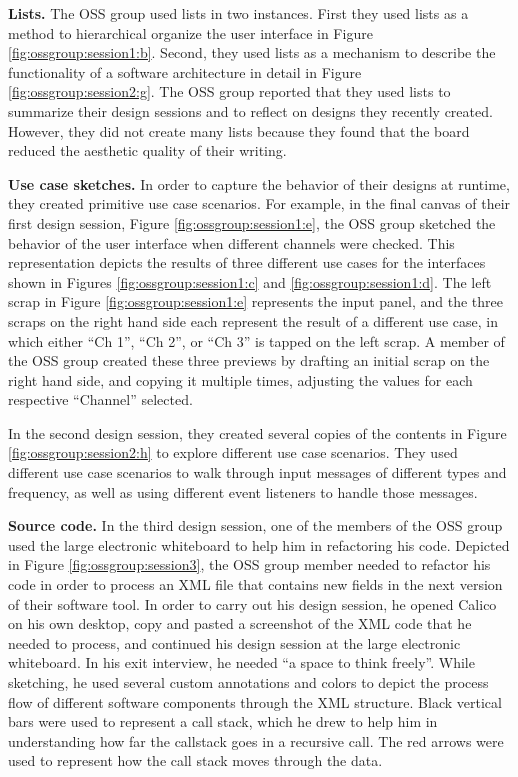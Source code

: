 \textbf{Lists. } The OSS group used lists in two instances. First they used lists as a method to hierarchical organize the user interface in Figure \ref{fig:ossgroup:session1:b}. Second, they used lists as a mechanism to describe the functionality of a software architecture in detail in Figure \ref{fig:ossgroup:session2:g}. The OSS group reported that they used lists to summarize their design sessions and to reflect on designs they recently created. However, they did not create many lists because they found that the board reduced the aesthetic quality of their writing.

\textbf{Use case sketches. } In order to capture the behavior of their designs at runtime, they created primitive use case scenarios. For example, in the final canvas of their first design session, Figure \ref{fig:ossgroup:session1:e}, the OSS group sketched the behavior of the user interface when different channels were checked. This representation depicts the results of three different use cases for the interfaces shown in Figures \ref{fig:ossgroup:session1:c} and \ref{fig:ossgroup:session1:d}. The left scrap in Figure \ref{fig:ossgroup:session1:e} represents the input panel, and the three scraps on the right hand side each represent the result of a different use case, in which either ``Ch 1'', ``Ch 2'', or ``Ch 3'' is tapped on the left scrap. A member of the OSS group created these three previews by drafting an initial scrap on the right hand side, and copying it multiple times, adjusting the values for each respective ``Channel'' selected. 

In the second design session, they created several copies of the contents in Figure \ref{fig:ossgroup:session2:h} to explore different use case scenarios. They used different use case scenarios to walk through input messages of different types and frequency, as well as using different event listeners to handle those messages.

\textbf{Source code. } In the third design session, one of the members of the OSS group used the large electronic whiteboard to help him in refactoring his code. Depicted in Figure \ref{fig:ossgroup:session3}, the OSS group member needed to refactor his code in order to process an XML file that contains new fields in the next version of their software tool. In order to carry out his design session, he opened Calico on his own desktop, copy and pasted a screenshot of the XML code that he needed to process, and continued his design session at the large electronic whiteboard. In his exit interview, he needed ``a space to think freely''. While sketching, he used several custom annotations and colors to depict the process flow of different software components through the XML structure. Black vertical bars were used to represent a call stack, which he drew to help him in understanding how far the callstack goes in a recursive call. The red arrows were used to represent how the call stack moves through the data.

